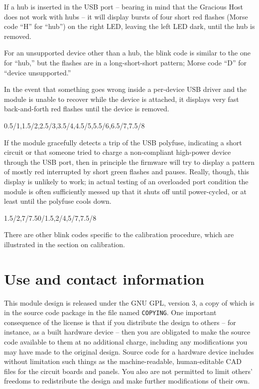 If a hub is inserted in the USB port -- bearing in mind that the Gracious
Host does not work with hubs -- it will display bursts of four short red
flashes (Morse code ``H'' for ``hub'') on the right LED, leaving the left
LED dark, until the hub is removed.

\nopagebreak
{}

For an unsupported device other than a hub, the blink code is similar to the
one for ``hub,'' but the flashes are in a long-short-short pattern; Morse
code ``D'' for ``device unsupported.''

\nopagebreak
{}

In the event that something goes wrong inside a per-device USB driver and
the module is unable to recover while the device is attached, it displays
very fast back-and-forth red flashes until the device is removed.

\nopagebreak
{}%
{}{0.5/1,1.5/2,2.5/3,3.5/4,4.5/5,5.5/6,6.5/7,7.5/8}

If the module gracefully detects a trip of the USB polyfuse, indicating a
short circuit or that someone tried to charge a non-compliant high-power
device through the USB port, then in principle the firmware will try to
display a pattern of mostly red interrupted by short green flashes and
pauses.  Really, though, this display is unlikely to work; in actual testing
of an overloaded port condition the module is often sufficiently messed up
that it shuts off until power-cycled, or at least until the polyfuse cools
down.

\nopagebreak
{}%
{1.5/2,7/7.5}{0/1.5,2/4,5/7,7.5/8}

There are other blink codes specific to the calibration procedure, which are
illustrated in the section on calibration.

\section{Use and contact information}

This module design is released under the GNU GPL, version 3, a copy of which
is in the source code package in the file named \texttt{COPYING}.  One
important consequence of the license is that if you distribute the design to
others -- for instance, as a built hardware device -- then you are obligated
to make the source code available to them at no additional charge, including
any modifications you may have made to the original design.  Source code for
a hardware device includes without limitation such things as the
machine-readable, human-editable CAD files for the circuit boards and
panels.  You also are not permitted to limit others' freedoms to
redistribute the design and make further modifications of their own.

